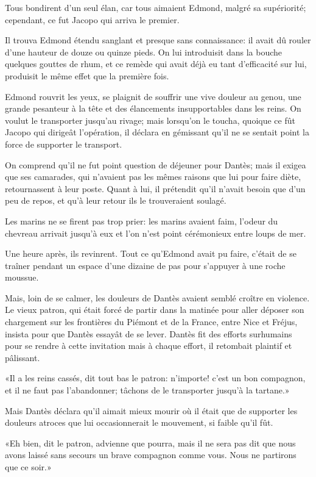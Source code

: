 Tous bondirent d'un seul élan, car tous aimaient Edmond, malgré sa supériorité; cependant, ce fut Jacopo qui arriva le premier.

Il trouva Edmond étendu sanglant et presque sans connaissance: il avait dû rouler d'une hauteur de douze ou quinze pieds. On lui introduisit dans la bouche quelques gouttes de rhum, et ce remède qui avait déjà eu tant d'efficacité sur lui, produisit le même effet que la première fois.

Edmond rouvrit les yeux, se plaignit de souffrir une vive douleur au genou, une grande pesanteur à la tête et des élancements insupportables dans les reins. On voulut le transporter jusqu'au rivage; mais lorsqu'on le toucha, quoique ce fût Jacopo qui dirigeât l'opération, il déclara en gémissant qu'il ne se sentait point la force de supporter le transport.

On comprend qu'il ne fut point question de déjeuner pour Dantès; mais il exigea que ses camarades, qui n'avaient pas les mêmes raisons que lui pour faire diète, retournassent à leur poste. Quant à lui, il prétendit qu'il n'avait besoin que d'un peu de repos, et qu'à leur retour ils le trouveraient soulagé.

Les marins ne se firent pas trop prier: les marins avaient faim, l'odeur du chevreau arrivait jusqu'à eux et l'on n'est point cérémonieux entre loups de mer.

Une heure après, ils revinrent. Tout ce qu'Edmond avait pu faire, c'était de se traîner pendant un espace d'une dizaine de pas pour s'appuyer à une roche moussue.

Mais, loin de se calmer, les douleurs de Dantès avaient semblé croître en violence. Le vieux patron, qui était forcé de partir dans la matinée pour aller déposer son chargement sur les frontières du Piémont et de la France, entre Nice et Fréjus, insista pour que Dantès essayât de se lever. Dantès fit des efforts surhumains pour se rendre à cette invitation mais à chaque effort, il retombait plaintif et pâlissant.

«Il a les reins cassés, dit tout bas le patron: n'importe! c'est un bon compagnon, et il ne faut pas l'abandonner; tâchons de le transporter jusqu'à la tartane.»

Mais Dantès déclara qu'il aimait mieux mourir où il était que de supporter les douleurs atroces que lui occasionnerait le mouvement, si faible qu'il fût.

«Eh bien, dit le patron, advienne que pourra, mais il ne sera pas dit que nous avons laissé sans secours un brave compagnon comme vous. Nous ne partirons que ce soir.»

